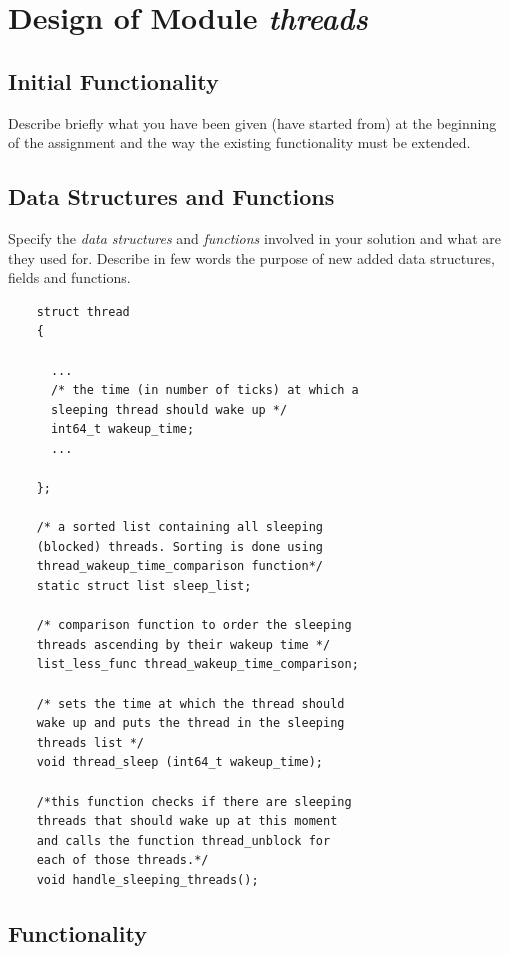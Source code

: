 
\chapter{Design of Module \textit{threads}}


\section{Initial Functionality}

Describe briefly what you have been given (have started from) at the beginning of the assignment and the way the existing functionality must be extended.

\section{Data Structures and Functions}

Specify the \textit{data structures} and \textit{functions} involved in your solution and what are they used for. Describe in few words the purpose of new added data structures, fields and functions. 

\begin{lstlisting}
    struct thread
    {

	  ...
      /* the time (in number of ticks) at which a 
	  sleeping thread should wake up */
	  int64_t wakeup_time;		
	  ...

    };
    
    /* a sorted list containing all sleeping 
    (blocked) threads. Sorting is done using 
    thread_wakeup_time_comparison function*/
    static struct list sleep_list;

    /* comparison function to order the sleeping
    threads ascending by their wakeup time */
    list_less_func thread_wakeup_time_comparison;

    /* sets the time at which the thread should 
    wake up and puts the thread in the sleeping 
    threads list */
    void thread_sleep (int64_t wakeup_time);

    /*this function checks if there are sleeping
    threads that should wake up at this moment 
    and calls the function thread_unblock for 
    each of those threads.*/
    void handle_sleeping_threads();    
\end{lstlisting}


\section{Functionality}

